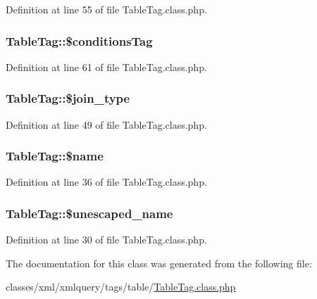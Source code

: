 Definition at line 55 of file Table\+Tag.\+class.\+php.

\subsubsection[{\texorpdfstring{\$conditions\+Tag}{$conditionsTag}}]{\setlength{\rightskip}{0pt plus 5cm}Table\+Tag\+::\$conditions\+Tag}\hypertarget{classTableTag_adb5ca6b036a491af6be55e2253393ccc}{}\label{classTableTag_adb5ca6b036a491af6be55e2253393ccc}


Definition at line 61 of file Table\+Tag.\+class.\+php.

\subsubsection[{\texorpdfstring{\$join\+\_\+type}{$join_type}}]{\setlength{\rightskip}{0pt plus 5cm}Table\+Tag\+::\$join\+\_\+type}\hypertarget{classTableTag_ac78ab418306b73bfba9782dcea2b5436}{}\label{classTableTag_ac78ab418306b73bfba9782dcea2b5436}


Definition at line 49 of file Table\+Tag.\+class.\+php.

\subsubsection[{\texorpdfstring{\$name}{$name}}]{\setlength{\rightskip}{0pt plus 5cm}Table\+Tag\+::\$name}\hypertarget{classTableTag_adab1e27e976c86151cadf9dd315427c7}{}\label{classTableTag_adab1e27e976c86151cadf9dd315427c7}


Definition at line 36 of file Table\+Tag.\+class.\+php.

\subsubsection[{\texorpdfstring{\$unescaped\+\_\+name}{$unescaped_name}}]{\setlength{\rightskip}{0pt plus 5cm}Table\+Tag\+::\$unescaped\+\_\+name}\hypertarget{classTableTag_aa7fe4c9dfe7ea60993ebaf0bd2f24e56}{}\label{classTableTag_aa7fe4c9dfe7ea60993ebaf0bd2f24e56}


Definition at line 30 of file Table\+Tag.\+class.\+php.



The documentation for this class was generated from the following file\+:\begin{DoxyCompactItemize}
\item 
classes/xml/xmlquery/tags/table/\hyperlink{TableTag_8class_8php}{Table\+Tag.\+class.\+php}\end{DoxyCompactItemize}
